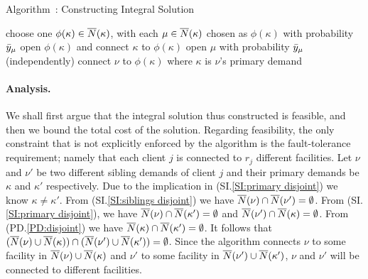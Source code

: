 
\begin{algorithm}
  \caption{Algorithm~{\ECHS}:
    Constructing Integral Solution}
  \label{alg:lpr3}
  \begin{algorithmic}[1]
    \State choose one $\phi(\kappa)\in {\overline{N}}(\kappa)$,
    with each $\mu\in{\overline{N}}(\kappa)$ chosen as $\phi(\kappa)$
    with probability ${\bar y}_\mu$
    \State open $\phi(\kappa)$ and connect $\kappa$ to $\phi(\kappa)$
    \EndFor
    \State open $\mu$ with probability ${\bar y}_\mu$ (independently)
    \EndFor
    \Else
    \State connect $\nu$ to $\phi(\kappa)$ where $\kappa$ is $\nu$'s
     primary demand
    \EndIf
    \EndFor
  \end{algorithmic}
\end{algorithm}


\paragraph{Analysis.}
We shall first argue that the integral solution thus
constructed is feasible, and then we bound the total cost of
the solution. Regarding feasibility, the only constraint
that is not explicitly enforced by the algorithm is the
fault-tolerance requirement; namely that each client $j$ is
connected to $r_j$ different facilities. Let $\nu$ and
$\nu'$ be two different sibling demands of client $j$ and
their primary demands be $\kappa$ and $\kappa'$
respectively. Due to the implication in (SI.\ref{SI:primary
  disjoint}) we know $\kappa \neq \kappa'$. From
(SI.\ref{SI:siblings disjoint}) we have ${\overline{N}}(\nu) \cap
{\overline{N}}(\nu') = \emptyset$. From (SI.\ref{SI:primary
  disjoint}), we have ${\overline{N}}(\nu) \cap {\overline{N}}(\kappa') =
\emptyset$ and ${\overline{N}}(\nu') \cap {\overline{N}}(\kappa) =
\emptyset$. From (PD.\ref{PD:disjoint}) we have
${\overline{N}}(\kappa)\cap {\overline{N}}(\kappa') = \emptyset$. It follows
that $({\overline{N}}(\nu) \cup {\overline{N}}(\kappa)) \cap ({\overline{N}}(\nu')
\cup {\overline{N}}(\kappa')) = \emptyset$. Since the algorithm
connects $\nu$ to some facility in ${\overline{N}}(\nu) \cup
{\overline{N}}(\kappa)$ and $\nu'$ to some facility in ${\overline{N}}(\nu')
\cup {\overline{N}}(\kappa')$, $\nu$ and $\nu'$ will be connected to
different facilities.


